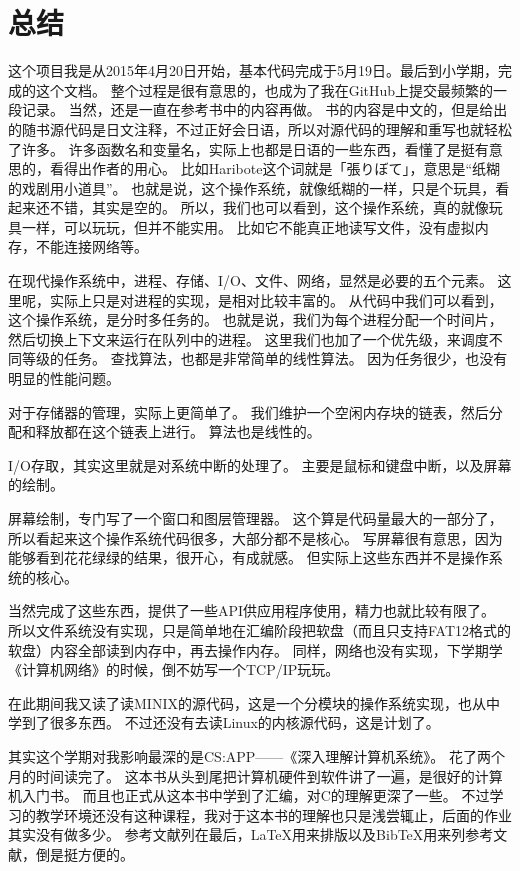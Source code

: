 ﻿\section{总结}

这个项目我是从2015年4月20日开始，基本代码完成于5月19日。最后到小学期，完成的这个文档。
整个过程是很有意思的，也成为了我在GitHub上提交最频繁的一段记录。
当然，还是一直在参考书\cite{osask}中的内容再做。
书的内容是中文的，但是给出的随书源代码是日文注释，不过正好会日语，所以对源代码的理解和重写也就轻松了许多。
许多函数名和变量名，实际上也都是日语的一些东西，看懂了是挺有意思的，看得出作者的用心。
比如Haribote这个词就是{\ja 「張りぼて」}，意思是“纸糊的戏剧用小道具”。
也就是说，这个操作系统，就像纸糊的一样，只是个玩具，看起来还不错，其实是空的。
所以，我们也可以看到，这个操作系统，真的就像玩具一样，可以玩玩，但并不能实用。
比如它不能真正地读写文件，没有虚拟内存，不能连接网络等。

在现代操作系统中，进程、存储、I/O、文件、网络，显然是必要的五个元素。
这里呢，实际上只是对进程的实现，是相对比较丰富的。
从代码中我们可以看到，这个操作系统，是分时多任务的。
也就是说，我们为每个进程分配一个时间片，然后切换上下文来运行在队列中的进程。
这里我们也加了一个优先级，来调度不同等级的任务。
查找算法，也都是非常简单的线性算法。
因为任务很少，也没有明显的性能问题。

对于存储器的管理，实际上更简单了。
我们维护一个空闲内存块的链表，然后分配和释放都在这个链表上进行。
算法也是线性的。

I/O存取，其实这里就是对系统中断的处理了。
主要是鼠标和键盘中断，以及屏幕的绘制。

屏幕绘制，专门写了一个窗口和图层管理器。
这个算是代码量最大的一部分了，所以看起来这个操作系统代码很多，大部分都不是核心。
写屏幕很有意思，因为能够看到花花绿绿的结果，很开心，有成就感。
但实际上这些东西并不是操作系统的核心。

当然完成了这些东西，提供了一些API供应用程序使用，精力也就比较有限了。
所以文件系统没有实现，只是简单地在汇编阶段把软盘（而且只支持FAT12格式的软盘）内容全部读到内存中，再去操作内存。
同样，网络也没有实现，下学期学《计算机网络》的时候，倒不妨写一个TCP/IP玩玩。

在此期间我又读了读MINIX\cite{minix3}的源代码，这是一个分模块的操作系统实现，也从中学到了很多东西。
不过还没有去读Linux的内核源代码，这是计划了。

其实这个学期对我影响最深的是CS:APP——《深入理解计算机系统》\cite{csappv2}。
花了两个月的时间读完了。
这本书从头到尾把计算机硬件到软件讲了一遍，是很好的计算机入门书。
而且也正式从这本书中学到了汇编，对C的理解更深了一些。
不过学习的教学环境还没有这种课程，我对于这本书的理解也只是浅尝辄止，后面的作业其实没有做多少。
参考文献列在最后，\LaTeX 用来排版以及{\sc Bib}\TeX 用来列参考文献，倒是挺方便的。

